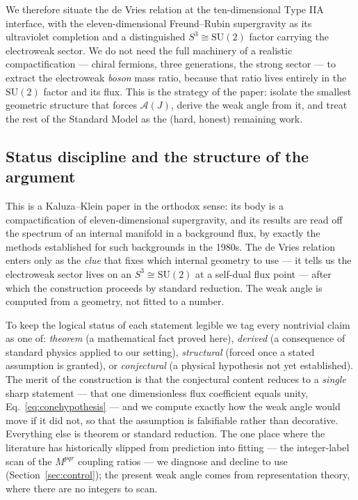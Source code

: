 \documentclass[11pt]{article}
\theoremstyle{plain}
\theoremstyle{definition}
\newcommand{\cA}{\mathcal{A}}
\newcommand{\SU}{\mathrm{SU}}
\begin{document}
We therefore situate the de Vries relation at the ten-dimensional Type IIA
interface, with the eleven-dimensional Freund--Rubin supergravity as its
ultraviolet completion and a distinguished $S^3\cong\SU(2)$ factor carrying
the electroweak sector. We do not need the full machinery of a realistic
compactification --- chiral fermions, three generations, the strong sector ---
to extract the electroweak \emph{boson} mass ratio, because that ratio lives
entirely in the $\SU(2)$ factor and its flux. This is the strategy of the
paper: isolate the smallest geometric structure that forces $\cA(J)$, derive
the weak angle from it, and treat the rest of the Standard Model as the (hard,
honest) remaining work.

\subsection{Status discipline and the structure of the argument}

This is a Kaluza--Klein paper in the orthodox sense: its body is a
compactification of eleven-dimensional supergravity, and its results are
read off the spectrum of an internal manifold in a background flux, by
exactly the methods established for such backgrounds in the 1980s. The de
Vries relation enters only as the \emph{clue} that fixes which internal
geometry to use --- it tells us the electroweak sector lives on an
$S^3\cong\SU(2)$ at a self-dual flux point --- after which the construction
proceeds by standard reduction. The weak angle is computed from a geometry,
not fitted to a number.

To keep the logical status of each statement legible we tag every
nontrivial claim as one of: \emph{theorem} (a mathematical fact proved
here), \emph{derived} (a consequence of standard physics applied to our
setting), \emph{structural} (forced once a stated assumption is granted), or
\emph{conjectural} (a physical hypothesis not yet established). The merit of
the construction is that the conjectural content reduces to a \emph{single}
sharp statement --- that one dimensionless flux coefficient equals unity,
Eq.~\eqref{eq:conehypothesis} --- and we compute exactly how the weak angle
would move if it did not, so that the assumption is falsifiable rather than
decorative. Everything else is theorem or standard reduction. The one place
where the literature has historically slipped from prediction into fitting
--- the integer-label scan of the $M^{pqr}$ coupling ratios --- we diagnose
and decline to use (Section~\ref{sec:control}); the present weak angle comes
from representation theory, where there are no integers to scan.
\end{document}
